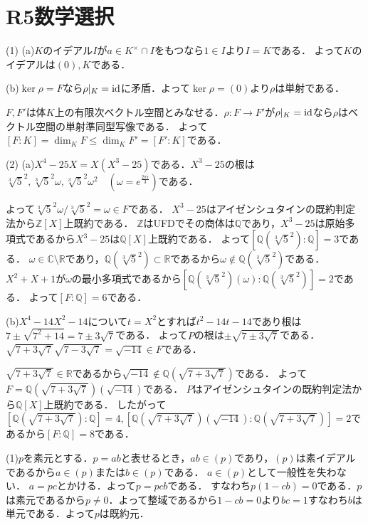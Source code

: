 \documentclass[
		book,
		head_space=20mm,
		foot_space=20mm,
		gutter=10mm,
		line_length=190mm
]{jlreq}
\begin{document}
\section{R5数学選択}
(1)
(a)$K$のイデアル$I$が$a\in K^\times \cap I$をもつなら$1\in I$より$I=K$である．
よって$K$のイデアルは$(0),K$である．

(b)$\ker \rho=F$なら$\rho|_K=\mathop{\mathrm{id}}$に矛盾．よって$\ker \rho=(0)$より$\rho$は単射である．

$F,F'$は体$K$上の有限次ベクトル空間とみなせる．$\rho:F\rightarrow F'$が$\rho|_K=\mathop{\mathrm{id}}$なら$\rho$はベクトル空間の単射準同型写像である．
よって$[F:K]=\dim_K F\le \dim_K F'=[F':K]$である．

(2)
(a)$X^4-25X=X(X^3-25)$である．$X^3-25$の根は$\sqrt[3]{5}^2,\sqrt[3]{5}^2\omega,\sqrt[3]{5}^2\omega^2\quad(\omega=e^{\frac{2\pi i}{3}})$である．

よって$\sqrt[3]{5}^2\omega/\sqrt[3]{5}^2=\omega\in F$である．
$X^3-25$はアイゼンシュタインの既約判定法から$\mathbb{Z}[X]$上既約である．
$\mathbb{Z}$はUFDでその商体は$\mathbb{Q}$であり，$X^3-25$は原始多項式であるから$X^3-25$は$\mathbb{Q}[X]$上既約である．
よって$[\mathbb{Q}(\sqrt[3]{5}^2):\mathbb{Q}]=3$である．
$\omega\in \mathbb{C}\setminus \mathbb{R}$であり，$\mathbb{Q}(\sqrt[3]{5}^2)\subset \mathbb{R}$であるから$\omega\notin \mathbb{Q}(\sqrt[3]{5}^2)$である．
$X^2+X+1$が$\omega$の最小多項式であるから$[\mathbb{Q}(\sqrt[3]{5}^2)(\omega):\mathbb{Q}(\sqrt[3]{5}^2)]=2$である．
よって$[F:\mathbb{Q}]=6$である．

(b)$X^4-14X^2-14$について$t=X^2$とすれば$t^2-14t-14$であり根は$7\pm\sqrt{7^2+14}=7\pm3\sqrt{7}$である．
よって$P$の根は$\pm \sqrt{7\pm3\sqrt{7}}$である．
$\sqrt{7+3\sqrt{7}}\sqrt{7-3\sqrt{7}}=\sqrt{-14}\in F$である．

$\sqrt{7+3\sqrt{7}}\in \mathbb{R}$であるから$\sqrt{-14}\notin\mathbb{Q}(\sqrt{7+3\sqrt{7}})$である．
よって$F=\mathbb{Q}(\sqrt{7+3\sqrt{7}})(\sqrt{-14})$である．
$P$はアイゼンシュタインの既約判定法から$\mathbb{Q}[X]$上既約である．
したがって
$[\mathbb{Q}(\sqrt{7+3\sqrt{7}}):\mathbb{Q}]=4,[\mathbb{Q}(\sqrt{7+3\sqrt{7}})(\sqrt{-14}):\mathbb{Q}(\sqrt{7+3\sqrt{7}})]=2$であるから$[F:\mathbb{Q}]=8$である．

(1)$p$を素元とする．$p=ab$と表せるとき，$ab\in (p)$であり，$(p)$は素イデアルであるから$a\in (p)$または$b\in (p)$である．
$a\in (p)$として一般性を失わない．
$a=pc$とかける．よって$p=pcb$である．
すなわち$p(1-cb)=0$である．$p$は素元であるから$p\neq 0$．よって整域であるから$1-cb=0$より$bc=1$すなわち$b$は単元である．よって$p$は既約元．
\end{document}
